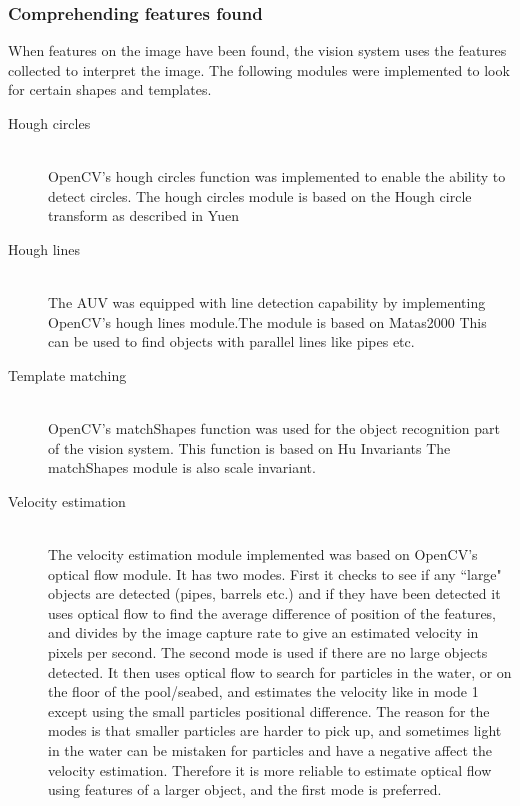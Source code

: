 \subsubsection{Comprehending features found} 
When features on the image have been found, the vision system uses the features collected to interpret the image. The following modules were implemented to look for certain shapes and templates.
\begin{description}
\item[Hough circles]\hfill \\
OpenCV's hough circles function was implemented to enable the ability to detect circles. The hough circles module is based on the Hough circle transform as described in Yuen \cite{article:yuen} 

\item[Hough lines]\hfill \\
The AUV was equipped with line detection capability by implementing OpenCV's hough lines module.The module is based on Matas2000 \cite{article:matas} This can be used to find objects with parallel lines like pipes etc.

\item[Template matching]\hfill \\
OpenCV's matchShapes function was used for the object recognition part of the vision system. This function is based on Hu Invariants \cite{article:hu} The matchShapes module is also scale invariant.

\item[Velocity estimation]\hfill \\
The velocity estimation module implemented was based on OpenCV's optical flow module. It has two modes. First it checks to see if any ``large" objects are detected (pipes, barrels etc.) and if they have been detected it uses optical flow to find the average difference of position of the features, and divides by the image capture rate to give an estimated velocity in pixels per second. 
The second mode is used if there are no large objects detected. It then uses optical flow to search for particles in the water, or on the floor of the pool/seabed, and estimates the velocity like in mode 1 except using the small particles positional difference. The reason for the modes is that smaller particles are harder to pick up, and sometimes light in the water can be mistaken for particles and have a negative affect the velocity estimation. Therefore it is more reliable to estimate optical flow using features of a larger object, and the first mode is preferred.
\end{description}

